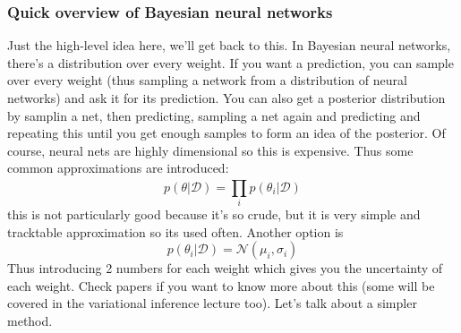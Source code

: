 \documentclass{report}
\begin{document}
\subsubsection{Quick overview of Bayesian neural networks}
Just the high-level idea here, we'll get back to this.
In Bayesian neural networks, there's a distribution over every weight.
If you want a prediction, you can sample over every weight (thus sampling a network from a distribution of neural networks)
and ask it for its prediction. You can also get a posterior distribution by samplin a net, then predicting, sampling a net again and predicting and repeating
this until you get enough samples to form an idea of the posterior.
Of course, neural nets are highly dimensional so this is expensive. Thus some common approximations are introduced:
\begin{equation}
		p(\theta| \mathcal{D}) = \prod_{i}^{} p(\theta_i|\mathcal{D}) 
\end{equation}
this is not particularly good because it's so crude, but it is very simple and tracktable approximation so its used often.
Another option is
\begin{equation}
		p(\theta_i|\mathcal{D}) = \mathcal{N}(\mu_i, \sigma_i)
\end{equation}
Thus introducing 2 numbers for each weight which gives you the uncertainty of each weight.
Check papers if you want to know more about this (some will be covered in the variational inference lecture too).
Let's talk about a simpler method.
\end{document}
